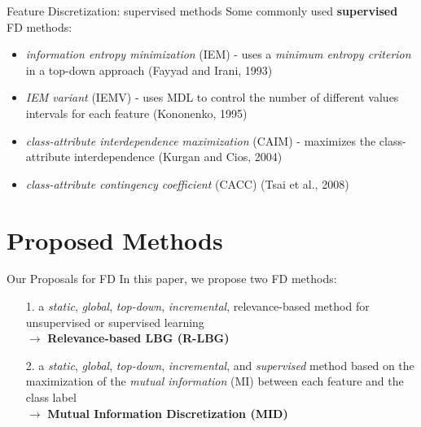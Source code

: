 \documentclass{beamer}
\begin{document}
\begin{frame}{Feature Discretization: supervised methods}
Some commonly used \textbf{supervised} FD methods:
\begin{itemize}
	\vfill
	\item \emph{information entropy minimization} (IEM) - uses
	a \emph{minimum entropy criterion} in a top-down approach (Fayyad and Irani, 1993)
	
	\vfill
	\item \emph{IEM variant} (IEMV) - uses MDL to control the number of different
values intervals for each feature (Kononenko, 1995)

	\vfill
	\item \emph{class-attribute interdependence maximization}
	(CAIM) - maximizes the class-attribute interdependence (Kurgan and Cios, 2004)
	
  \vfill
	\item \emph{class-attribute contingency
coefficient} (CACC) (Tsai et al., 2008)
\end{itemize}

\end{frame}


\section[Proposed Methods]{Proposed Methods}
\begin{frame}{Our Proposals for FD}
\vfill
In this paper, we propose two FD methods:
\begin{itemize}
	\vfill
	\item [1.] a \emph{static}, \emph{global}, \emph{top-down}, \emph{incremental}, relevance-based method for unsupervised
	or supervised learning\\
	$\longrightarrow$ \textbf{Relevance-based LBG (R-LBG)}
	
	\vfill
	\item [2.] a \emph{static}, \emph{global}, \emph{top-down}, \emph{incremental}, and
	\emph{supervised} method based on the maximization of
	the \emph{mutual information} (MI) between each feature
	and the class label \\
	$\longrightarrow$ \textbf{Mutual Information Discretization (MID)}
\end{itemize}
\end{frame}


\end{document}
